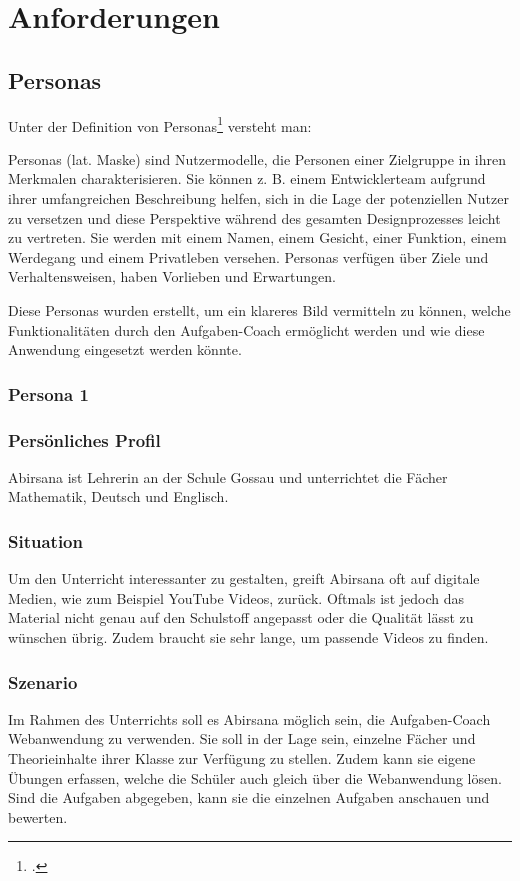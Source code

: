 \section{Anforderungen}

\subsection{Personas}
Unter der Definition von Personas\footcite{persona_definition} versteht man: 
\begin{displayquote}
Personas (lat. Maske) sind Nutzermodelle, die Personen einer Zielgruppe in ihren Merkmalen charakterisieren. Sie können z. B. einem Entwicklerteam aufgrund ihrer umfangreichen Beschreibung helfen, sich in die Lage der potenziellen Nutzer zu versetzen und diese Perspektive während des gesamten Designprozesses leicht zu vertreten. Sie werden mit einem Namen, einem Gesicht, einer Funktion, einem Werdegang und einem Privatleben versehen. Personas verfügen über Ziele und Verhaltensweisen, haben Vorlieben und Erwartungen.
\end{displayquote}

Diese Personas wurden erstellt, um ein klareres Bild vermitteln zu können, welche Funktionalitäten durch den Aufgaben-Coach ermöglicht werden und wie diese Anwendung eingesetzt werden könnte.

\subsubsection{Persona 1}
\subsubsection*{Persönliches Profil}
Abirsana ist Lehrerin an der Schule Gossau und unterrichtet die Fächer Mathematik, Deutsch und Englisch.

\subsubsection*{Situation}
Um den Unterricht interessanter zu gestalten, greift Abirsana oft auf digitale Medien, wie zum Beispiel YouTube Videos, zurück. Oftmals ist jedoch das Material nicht genau auf den Schulstoff angepasst oder die Qualität lässt zu wünschen übrig. Zudem braucht sie sehr lange, um passende Videos zu finden.

\subsubsection*{Szenario}
Im Rahmen des Unterrichts soll es Abirsana möglich sein, die Aufgaben-Coach Webanwendung zu verwenden. Sie soll in der Lage sein, einzelne Fächer und Theorieinhalte ihrer Klasse zur Verfügung zu stellen. Zudem kann sie eigene Übungen erfassen, welche die Schüler auch gleich über die Webanwendung lösen. Sind die Aufgaben abgegeben, kann sie die einzelnen Aufgaben anschauen und bewerten.

